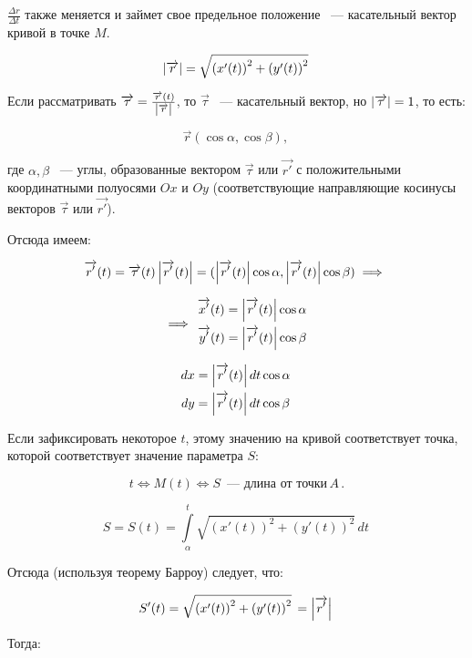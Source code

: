\documentclass[../../main.tex]{subfiles}
\begin{document}
	$\frac{\Delta r}{\Delta t}$ также меняется и займет свое предельное положение
	~--- касательный вектор кривой в точке $M$.
	
	\[
	\left|{\overrightarrow{r}}\right| =
	\sqrt{\left( x'(t) \right)^2 + \left( y'(t) \right)^2}\,
	\]
	
	Если рассматривать $\overrightarrow{\tau} = 
	\frac{\overrightarrow{r}(t)}{\left|{\overrightarrow{r}}\right|}$, то
	$\overrightarrow{\tau}$ ~--- касательный вектор,
	но $\left|{\overrightarrow{\tau}}\right| = 1$, то есть:
	
	\[
	{\overrightarrow{r}} (\cos\alpha, \cos\beta),\,
	\]
	
	где $\alpha, \beta$ ~--- углы, образованные вектором $\overrightarrow{\tau}$
	или $\overrightarrow{r'}$ с положительными координатными полуосями
	$Ox$ и $Oy$	(соответствующие направляющие косинусы векторов
	$\overrightarrow{\tau}$	или $\overrightarrow{r'}$).
	
	Отсюда имеем:
	
	\[
	\overrightarrow{r'}(t) = \overrightarrow{\tau}(t)\left|{\overrightarrow{r'}(t)}\right| 
	=
	(\left|{\overrightarrow{r'}(t)}\right|\cos \alpha, \left|{\overrightarrow{r'}(t)}\right|\cos 
	\beta)
	\implies\,
	\]
	
	\[
	\implies\, \begin{gathered}
	\overrightarrow{x'}(t) = \left|{\overrightarrow{r'}(t)}\right|\cos \alpha\, \\
	\overrightarrow{y'}(t) = \left|{\overrightarrow{r'}(t)}\right|\cos \beta\,
	\end{gathered}
	\]
	
	\[
	\begin{gathered}
	dx = \left|{\overrightarrow{r'}(t)}\right| dt\cos \alpha\, \\
	dy = \left|{\overrightarrow{r'}(t)}\right| dt\cos \beta\,
	\end{gathered}
	\]
	
	Если зафиксировать некоторое $t$, этому значению
	на кривой соответствует точка,
	которой соответствует значение параметра $S$:
	
	\[
	t \iff M(t) \iff S\, \text{~--- длина от точки}\, A\,.
	\]
	
	\[
	S = S(t) = \int\limits_{\alpha}^{t} \sqrt{\left( x'(t) \right)^2
	+ \left( y'(t) \right)^2}\, dt\,
	\]
	
	Отсюда (используя теорему Барроу) следует, что:
	
	\[
	S'(t) = \sqrt{\left( x'(t) \right)^2 + \left( y'(t) \right)^2}\, =
	\left|{\overrightarrow{r'}}\right|\,
	\]
	
	Тогда:
	
\end{document}

